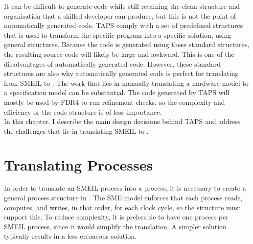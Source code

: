 It can be difficult to generate code while still retaining the clean structure and organisation that a skilled developer can produce, but this is not the point of automatically generated code. TAPS comply with a set of predefined structures that is used to transform the specific program into a specific solution, using general structures. Because the code is generated using these standard structures, the resulting source code will likely be large and awkward. This is one of the disadvantages of automatically generated code. However, these standard structures are also why automatically generated code is perfect for translating from SMEIL to \cspm{}. The work that lies in manually translating a hardware model to a specification model can be substantial. The code generated by TAPS will mostly be used by FDR4 to run refinement checks, so the complexity and efficiency or the code structure is of less importance.\\

In this chapter, I describe the main design decisions behind TAPS and address the challenges that lie in translating SMEIL to \cspm{}.
\section{Translating Processes}
In order to translate an SMEIL process into a \cspm{} process, it is necessary to create a general process structure in \cspm{}. The SME model enforces that each process reads, computes, and writes, in that order, for each clock cycle, so the \cspm{} structure must support this. To reduce complexity, it is preferable to have one \cspm{} process per SMEIL process, since it would simplify the translation. A simpler solution typically results in a less erroneous solution.\\

